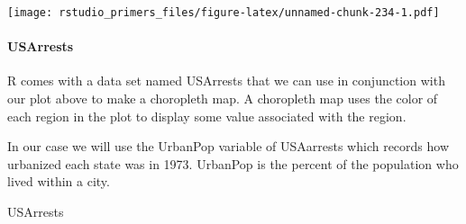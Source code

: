 \documentclass[
]{article}
\newenvironment{Shaded}{\begin{snugshade}}{\end{snugshade}}
\newcommand{\NormalTok}[1]{#1}
\begin{document}
\texttt{[image: rstudio\_primers\_files/figure-latex/unnamed-chunk-234-1.pdf]}

\hypertarget{usarrests}{%
\paragraph{USArrests}\label{usarrests}}

R comes with a data set named USArrests that we can use in conjunction
with our plot above to make a choropleth map. A choropleth map uses the
color of each region in the plot to display some value associated with
the region.

In our case we will use the UrbanPop variable of USAarrests which
records how urbanized each state was in 1973. UrbanPop is the percent of
the population who lived within a city.

\begin{Shaded}
\begin{Highlighting}[]
\NormalTok{USArrests}
\end{Highlighting}
\end{Shaded}
\end{document}
